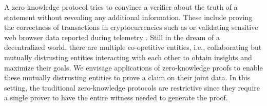 A zero-knowledge protocol tries to convince a verifier about the truth of a
statement without revealing any additional information. %
These include proving the correctness of
transactions in cryptocurrencies such as \cite{zerocash} or validating sensitive web browser data reported during
telemetry \cite{prio, MozillaPrio}. Still in the dream of a decentralized world, there are
multiple co-opetitive entities, i.e.,
collaborating but mutually distrusting entities interacting with each other to obtain insights
and maximize their goals. We envisage applications of zero-knowledge
proofs to enable these mutually
distrusting entities to prove a claim on their joint data. In this setting, the traditional zero-knowledge protocols are restrictive since they require
a single prover to have the entire witness needed to generate the proof. 

